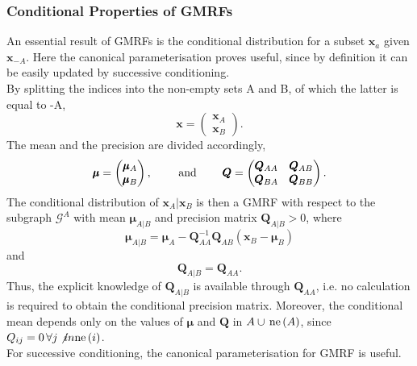 \subsubsection{Conditional Properties of GMRFs}
An essential result of GMRFs is the conditional distribution for a subset $\pmb{x}_a$ given $\pmb{x}_{-A}$. Here the canonical parameterisation proves useful, since by definition it can be easily updated by successive conditioning. \\
By splitting the indices into the non-empty sets A and B, of which the latter is equal to -A,
\begin{equation}\label{eq:partition_1}
    \pmb{x}=\begin{pmatrix}\pmb{x}_A\\\pmb{x}_B\end{pmatrix}.
\end{equation}
The mean and the precision are divided accordingly,
\begin{equation}\label{eq:partition_2}
    \pmb{\mu}=\begin{pmatrix}\pmb{\mu}_A\\\pmb{\mu}_B\end{pmatrix},\hspace{20pt}\hbox{ and }\hspace{20pt}\pmb{Q}=\begin{pmatrix}\pmb{Q}_{AA} & \pmb{Q}_{AB} \\ \pmb{Q}_{BA} & \pmb{Q}_{BB}\end{pmatrix}.
\end{equation}
The conditional distribution of $\pmb{x}_A|\pmb{x}_B$ is then a GMRF with respect to the subgraph $\mathcal{G}^A$ with mean $\pmb{\mu}_{A|B}$ and precision matrix $\pmb{Q}_{A|B}>0$, where
\begin{equation}
    \pmb{\mu}_{A|B}=\pmb{\mu}_A-\pmb{Q}_{AA}^{-1}\pmb{Q}_{AB}\left(\pmb{x}_B-\pmb{\mu}_B\right)
\end{equation}
and
\begin{equation*}
    \pmb{Q}_{A|B}=\pmb{Q}_{AA}.
\end{equation*}
Thus, the explicit knowledge of $\pmb{Q}_{A|B}$ is available through $\pmb{Q}_{AA}$, i.e. no calculation is required to obtain the conditional precision matrix. Moreover, the conditional mean depends only on the values of $\pmb{\mu}$ and $\pmb{Q}$ in $A\cup\,\hbox{ne}\left(A\right)$, since $Q_{ij} = 0\,\forall j\not in\hbox{ne}\left(i\right)$. \\
For successive conditioning, the canonical parameterisation for GMRF is useful. \\
